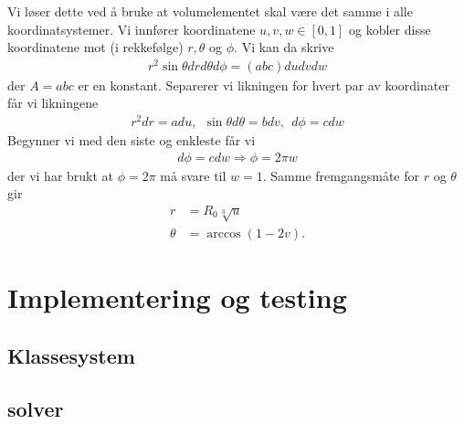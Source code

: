 \documentclass[11pt, twocolumn]{article}
\begin{document}
Vi løser dette ved å bruke at volumelementet skal være det samme i
alle koordinatsystemer. Vi innfører koordinatene $u, v, w \in [0,1]$
og kobler disse koordinatene mot (i rekkefølge) $r,\theta$ og
$\phi$. Vi kan da skrive 
\begin{align*}
  r^2\sin\theta dr d\theta d\phi = (abc)dudvdw
\end{align*}
der $A=abc$ er en konstant. Separerer vi likningen for hvert par av
koordinater får vi likningene 
\begin{align*}
  r^2dr = adu,\ \ \sin\theta d\theta = bdv,\ \ d\phi = cdw
\end{align*}
Begynner vi med den siste og enkleste får vi 
\begin{align}
  d\phi = cdw\Rightarrow \phi = 2\pi w
\end{align}
der vi har brukt at $\phi=2\pi$ må svare til $w=1$. Samme
fremgangsmåte for $r$ og $\theta$ gir
\begin{align}
  r &= R_0 \sqrt[3]{u}\\
  \theta &= \arccos(1-2v).
\end{align}


\section{Implementering og testing}
\subsection{Klassesystem}
\subsection{solver}




\printbibliography
\end{document}
